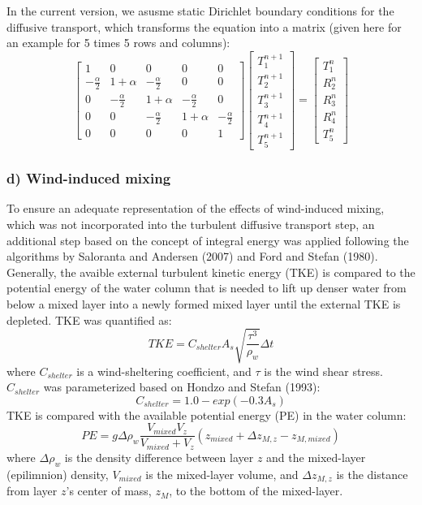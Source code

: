 \documentclass[
  letterpaper,
  DIV=11,
  numbers=noendperiod]{scrartcl}
\begin{document}
In the current version, we asusme static Dirichlet boundary conditions
for the diffusive transport, which transforms the equation into a matrix
(given here for an example for 5 times 5 rows and columns): \[
\begin{bmatrix}
1 & 0 & 0 & 0 &0 \\
- \frac{\alpha}{2} & 1+\alpha & - \frac{\alpha}{2} & 0 & 0 \\
0 &- \frac{\alpha}{2} & 1+\alpha & - \frac{\alpha}{2} & 0  \\
0 & 0 &- \frac{\alpha}{2} & 1+\alpha & - \frac{\alpha}{2} \\
0 & 0 & 0 & 0 & 1
\end{bmatrix} 
\begin{bmatrix} T_1^{n+1} \\  
T_2^{n+1} \\ 
 T_3^{n+1} \\ 
  T_4^{n+1} \\ 
   T_5^{n+1} 
\end{bmatrix} =
\begin{bmatrix} T_1^n \\  
R_2^n \\ 
 R_3^n \\ 
  R_4^n \\ 
   T_5^n
\end{bmatrix} 
\]

\hypertarget{d-wind-induced-mixing}{%
\subsubsection{d) Wind-induced mixing}\label{d-wind-induced-mixing}}

To ensure an adequate representation of the effects of wind-induced
mixing, which was not incorporated into the turbulent diffusive
transport step, an additional step based on the concept of integral
energy was applied following the algorithms by Saloranta and Andersen
(2007) and Ford and Stefan (1980). Generally, the avaible external
turbulent kinetic energy (TKE) is compared to the potential energy of
the water column that is needed to lift up denser water from below a
mixed layer into a newly formed mixed layer until the external TKE is
depleted. TKE was quantified as: \[
TKE = C_{shelter} A_s \sqrt{\frac{\tau^3}{\rho_w}} \Delta t
\] where \(C_{shelter}\) is a wind-sheltering coefficient, and \(\tau\)
is the wind shear stress. \(C_{shelter}\) was parameterized based on
Hondzo and Stefan (1993): \[
C_{shelter} = 1.0 - exp(-0.3 A_s)
\] TKE is compared with the available potential energy (PE) in the water
column: \[
PE = g \Delta \rho_w \frac{V_{mixed} V_z}{V_{mixed} + V_z} (z_{mixed} +\Delta z_{M, z} - z_{M, mixed})
\] where \(\Delta \rho_w\) is the density difference between layer \(z\)
and the mixed-layer (epilimnion) density, \(V_{mixed}\) is the
mixed-layer volume, and \(\Delta z_{M, z}\) is the distance from layer
\(z\)'s center of mass, \(z_M\), to the bottom of the mixed-layer.
\end{document}
